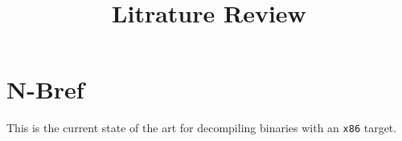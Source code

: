 \documentclass{article}
\title{Litrature Review}
\begin{document}
	\maketitle

	\section{N-Bref}

	This is the current state of the art for decompiling binaries with an \verb|x86| target.
\end{document}
